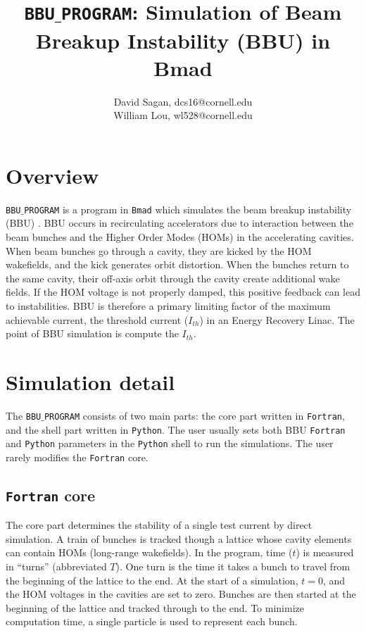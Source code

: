 \documentclass{article}
\begin{document}
\title{ \texttt{BBU$\_$PROGRAM}: Simulation of Beam Breakup Instability (BBU) in Bmad }
\author{ David Sagan, dcs16@cornell.edu \\
William Lou, wl528@cornell.edu }
\maketitle

\section{Overview}

\texttt{BBU$\_$PROGRAM} is a program in \texttt{Bmad} which simulates the beam breakup instability (BBU) \cite{Bmad}. BBU occurs in recirculating accelerators due to interaction between the beam bunches and the Higher Order Modes (HOMs) in the accelerating cavities. When beam bunches go through a cavity, they are kicked by the HOM wakefields, and the kick generates orbit distortion. When the bunches return to the same cavity, their off-axis orbit through the cavity create additional wake fields. If the HOM voltage is not properly damped, this positive feedback can lead to instabilities. BBU is therefore a primary limiting factor of the maximum achievable current, the threshold current ($I_{th}$) in an Energy Recovery Linac. The point of BBU simulation is compute the $I_{th}$.


\section{Simulation detail}

The \texttt{BBU$\_$PROGRAM} consists of two main parts: the core part written in \texttt{Fortran}, and the shell part written in \texttt{Python}. The user usually sets both BBU \texttt{Fortran} and \texttt{Python} parameters in the \texttt{Python} shell to run the simulations. The user rarely modifies the \texttt{Fortran} core. 

\subsection{\texttt{Fortran} core}
The core part determines the stability of a single test current by direct simulation. A train of bunches is tracked though a lattice whose cavity elements can contain HOMs (long-range wakefields). In the program, time ($t$) is measured in “turns” (abbreviated $T$). One turn is the time it
takes a bunch to travel from the beginning of the lattice to the end. At the start of a simulation, $t=0$, and the HOM voltages in the cavities are set to zero. Bunches are then started at
the beginning of the lattice and tracked through to the end. To minimize computation time, a single particle is used to represent each bunch.
\end{document}
